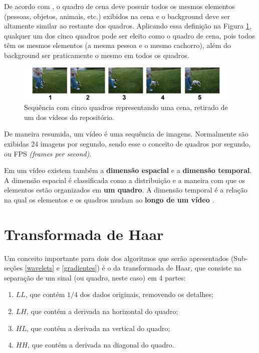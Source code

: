 	De acordo com \citeauthor{mao2015sceneframe}, o quadro de cena deve possuir todos os mesmos elementos (pessoas, objetos, animais, etc.) exibidos na cena e o background deve ser altamente similar ao restante dos quadros. Aplicando essa definição na Figura \ref{fig:quadro_cena}, qualquer um dos cinco quadros pode ser eleito como o quadro de cena, pois todos têm os mesmos elementos (a mesma pessoa e o mesmo cachorro), além do background ser praticamente o mesmo em todos os quadros.

 \begin{figure}[h]
      \centering
      \includegraphics[width=0.96\textwidth]{dados/figuras/keyframe.png}
      \caption{Sequência com cinco quadros representando uma cena, retirado de um dos vídeos do repositório.}
       	\label{fig:quadro_cena}
    \end{figure}   
    
    De maneira resumida, um vídeo é uma sequência de imagens. Normalmente são exibidas 24 imagens por segundo, sendo esse o conceito de quadros por segundo, ou FPS \textit{(frames per second)}. 
    
    Em um vídeo existem também a \textbf{dimensão espacial} e a \textbf{dimensão temporal}. A dimensão espacial é classificada como a distribuição e a maneira com que os elementos estão organizados em \textbf{um quadro}. A dimensão temporal é a relação na qual os elementos e os quadros mudam ao \textbf{longo de um vídeo} \citeauthor{hampapur2001comparison}.
    
\section{Transformada de Haar}

Um conceito importante para dois dos algoritmos que serão apresentados (Sub-seções  \ref{wavelets} e \ref{gradientes}) é o da transformada de Haar, que consiste na separação de um sinal (ou quadro, neste caso) em 4 partes: 

\begin{enumerate}
\item $LL$, que contém $1/4$ dos dados originais, removendo os detalhes;
\item $LH$, que contém a derivada na horizontal do quadro;
\item $HL$, que contém a derivada na vertical do quadro;
\item $HH$, que contém a derivada na diagonal do quadro.
\end{enumerate}

